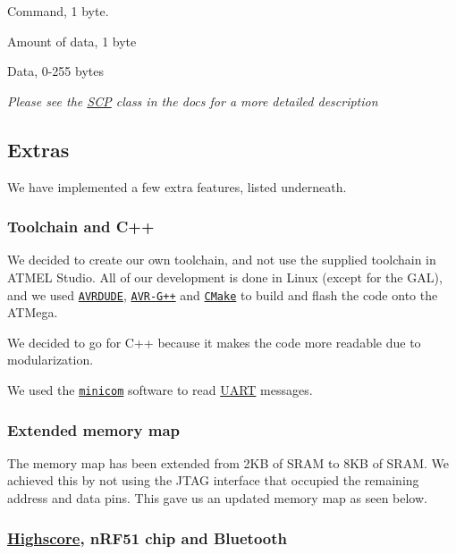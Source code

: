 \begin{DoxyItemize}
\item Command, 1 byte.
\item Amount of data, 1 byte
\item Data, 0-\/255 bytes
\end{DoxyItemize}

{\itshape Please see the \hyperlink{class_s_c_p}{S\+CP} class in the docs for a more detailed description}

\subsection*{Extras}

We have implemented a few extra features, listed underneath.

\subsubsection*{Toolchain and C++}

We decided to create our own toolchain, and not use the supplied toolchain in A\+T\+M\+EL Studio. All of our development is done in Linux (except for the G\+AL), and we used \href{http://www.nongnu.org/avrdude/}{\tt A\+V\+R\+D\+U\+DE}, \href{http://www.nongnu.org/avr-libc/}{\tt A\+V\+R-\/\+G++} and \href{https://cmake.org/}{\tt C\+Make} to build and flash the code onto the A\+T\+Mega.

We decided to go for C++ because it makes the code more readable due to modularization.

We used the \href{https://help.ubuntu.com/community/Minicom}{\tt minicom} software to read \hyperlink{class_u_a_r_t}{U\+A\+RT} messages.

\subsubsection*{Extended memory map}

The memory map has been extended from 2\+KB of S\+R\+AM to 8\+KB of S\+R\+AM. We achieved this by not using the J\+T\+AG interface that occupied the remaining address and data pins. This gave us an updated memory map as seen below.



\subsubsection*{\hyperlink{namespace_highscore}{Highscore}, n\+R\+F51 chip and Bluetooth}

